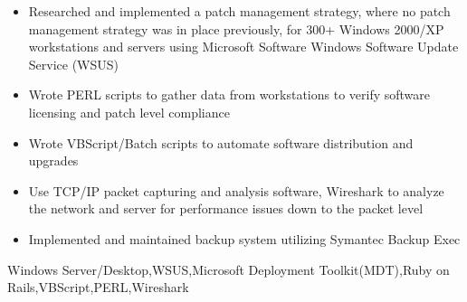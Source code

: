 \begin{experiences}
{\begin{itemize}
                        \item Researched and implemented a patch management strategy, where no patch management strategy was in place previously, for 300+ Windows 2000/XP workstations and servers using Microsoft Software Windows Software Update Service (WSUS)
                        \item Wrote PERL scripts to gather data from workstations to verify software licensing and patch level compliance
                        \item Wrote VBScript/Batch scripts to automate software distribution and upgrades
                        \item Use TCP/IP packet capturing and analysis software, Wireshark to analyze the network and server for performance issues down to the packet level
                        \item Implemented and maintained backup system utilizing Symantec Backup Exec
                      \end{itemize}
                    }
                    {Windows Server/Desktop,WSUS,Microsoft Deployment Toolkit(MDT),Ruby on Rails,VBScript,PERL,Wireshark}
\end{experiences}
